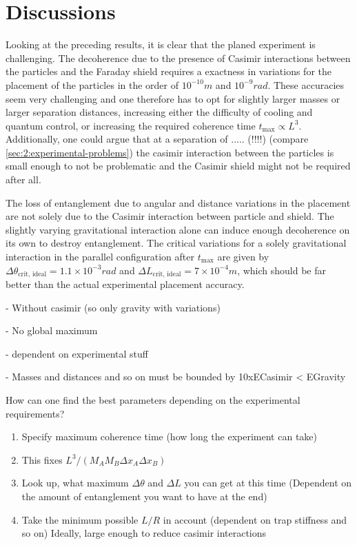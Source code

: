 \section{Discussions}\label{sec:4:discussion}
Looking at the preceding results, it is clear that the planed experiment is challenging. The decoherence due to the presence of Casimir interactions between the particles and the Faraday shield requires a exactness in variations for the placement of the particles in the order of $10^{-10}\si{m}$ and $10^{-9}\si{rad}$.
These accuracies seem very challenging and one therefore has to opt for slightly larger masses or larger separation distances, increasing either the difficulty of cooling and quantum control, or increasing the required coherence time $t_\mathrm{max} \propto L^3$.
Additionally, one could argue that at a separation of ..... (!!!!) (compare \cref{sec:2:experimental-problems}) the casimir interaction between the particles is small enough to not be problematic and the Casimir shield might not be required after all. 

The loss of entanglement due to angular and distance variations in the placement are not solely due to the Casimir interaction between particle and shield. 
The slightly varying gravitational interaction alone can induce enough decoherence on its own to destroy entanglement. 
The critical variations for a solely gravitational interaction in the parallel configuration after $t_\mathrm{max}$ are given by $\Delta \theta_\mathrm{crit,\,ideal} = 1.1 \times 10^{-3}\si{rad}$ and $\Delta L_\mathrm{crit,\,ideal} = 7\times 10^{-4}\si{m}$, which should be far better than the actual experimental placement accuracy.

- Without casimir (so only gravity with variations)

- No global maximum

- dependent on experimental stuff

- Masses and distances and so on must be bounded by 10xECasimir < EGravity

How can one find the best parameters depending on the experimental requirements?
\begin{enumerate}
  \item Specify maximum coherence time (how long the experiment can take)
  \item This fixes $L^3/(M_A M_B \Delta x_A \Delta x_B)$
  \item Look up, what maximum $\Delta \theta$ and $\Delta L$ you can get at this time (Dependent on the amount of entanglement you want to have at the end)
  \item Take the minimum possible $L/R$ in account (dependent on trap stiffness and so on) Ideally, large enough to reduce casimir interactions
\end{enumerate}


